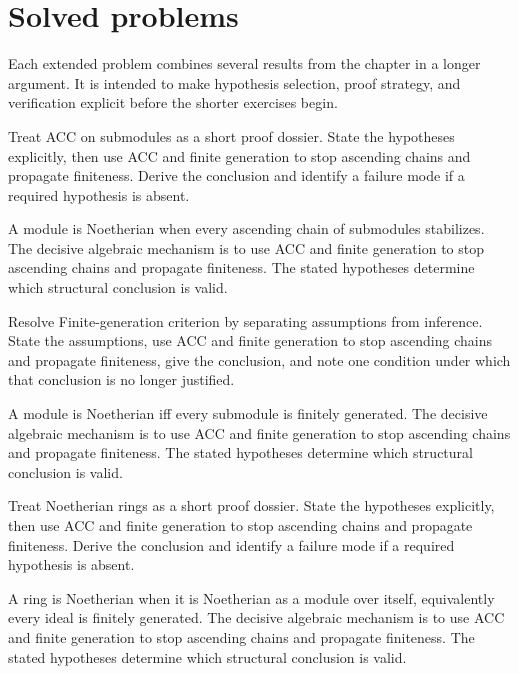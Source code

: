 \section{Solved problems}
Each extended problem combines several results from the chapter in a longer argument. It is intended to make hypothesis selection, proof strategy, and verification explicit before the shorter exercises begin.

\begin{problem}\label{prob:v15-problem-01}
Treat ACC on submodules as a short proof dossier. State the hypotheses explicitly, then use ACC and finite generation to stop ascending chains and propagate finiteness. Derive the conclusion and identify a failure mode if a required hypothesis is absent.
\end{problem}
\begin{solution}
A module is Noetherian when every ascending chain of submodules stabilizes. The decisive algebraic mechanism is to use ACC and finite generation to stop ascending chains and propagate finiteness. The stated hypotheses determine which structural conclusion is valid.
\end{solution}

\begin{problem}\label{prob:v15-problem-02}
Resolve Finite-generation criterion by separating assumptions from inference. State the assumptions, use ACC and finite generation to stop ascending chains and propagate finiteness, give the conclusion, and note one condition under which that conclusion is no longer justified.
\end{problem}
\begin{solution}
A module is Noetherian iff every submodule is finitely generated. The decisive algebraic mechanism is to use ACC and finite generation to stop ascending chains and propagate finiteness. The stated hypotheses determine which structural conclusion is valid.
\end{solution}

\begin{problem}\label{prob:v15-problem-03}
Treat Noetherian rings as a short proof dossier. State the hypotheses explicitly, then use ACC and finite generation to stop ascending chains and propagate finiteness. Derive the conclusion and identify a failure mode if a required hypothesis is absent.
\end{problem}
\begin{solution}
A ring is Noetherian when it is Noetherian as a module over itself, equivalently every ideal is finitely generated. The decisive algebraic mechanism is to use ACC and finite generation to stop ascending chains and propagate finiteness. The stated hypotheses determine which structural conclusion is valid.
\end{solution}

